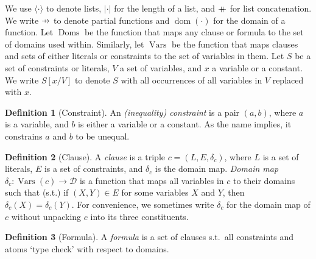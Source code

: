 \documentclass{article}
\theoremstyle{definition}
\newtheorem{definition}{Definition}
\theoremstyle{remark}
\newcommand\pfun{\mathrel{\ooalign{\hfil$\mapstochar\mkern5mu$\hfil\cr$\to$\cr}}}
\newcommand\mdoubleplus{\mathbin{+\mkern-10mu+}}
\DeclareMathOperator{\dom}{dom}
\DeclareMathOperator{\Doms}{Doms}
\DeclareMathOperator{\Vars}{Vars}
\begin{document}
We use $\langle\cdot\rangle$ to denote lists, $|\cdot|$ for the length of a
list, and $\mdoubleplus$ for list concatenation. We write $\pfun$ to denote
partial functions and $\dom(\cdot)$ for the domain of a function. Let $\Doms$ be
the function that maps any clause or formula to the set of domains used within.
Similarly, let $\Vars$ be the function that maps clauses and sets of either
literals or constraints to the set of variables in them. Let $S$ be a set of
constraints or literals, $V$ a set of variables, and $x$ a variable or a
constant. We write $S[x/V]$ to denote $S$ with all occurrences of all variables
in $V$ replaced with $x$.

\begin{definition}[Constraint]\label{def:constraint}
  An \emph{(inequality) constraint} is a pair $(a, b)$, where $a$ is a variable,
  and $b$ is either a variable or a constant. As the name implies, it constrains
  $a$ and $b$ to be unequal.
\end{definition}

\begin{definition}[Clause]\label{def:clause}
  A \emph{clause} is a triple $c = (L, E, \delta_c)$, where $L$ is a set of
  literals, $E$ is a set of constraints, and $\delta_c$ is the domain map.
  \emph{Domain map} $\delta_{c}\colon \Vars(c) \to \mathcal{D}$ is a function
  that maps all variables in $c$ to their domains such that (s.t.) if
  $(X, Y) \in E$ for some variables $X$ and $Y$, then
  $\delta_c(X) = \delta_c(Y)$. For convenience, we sometimes write $\delta_c$
  for the domain map of $c$ without unpacking $c$ into its three constituents.
\end{definition}

\begin{definition}[Formula]\label{def:formula}
  A \emph{formula} is a set of clauses s.t.\ all constraints and atoms `type
  check' with respect to domains.
\end{definition}
\end{document}
